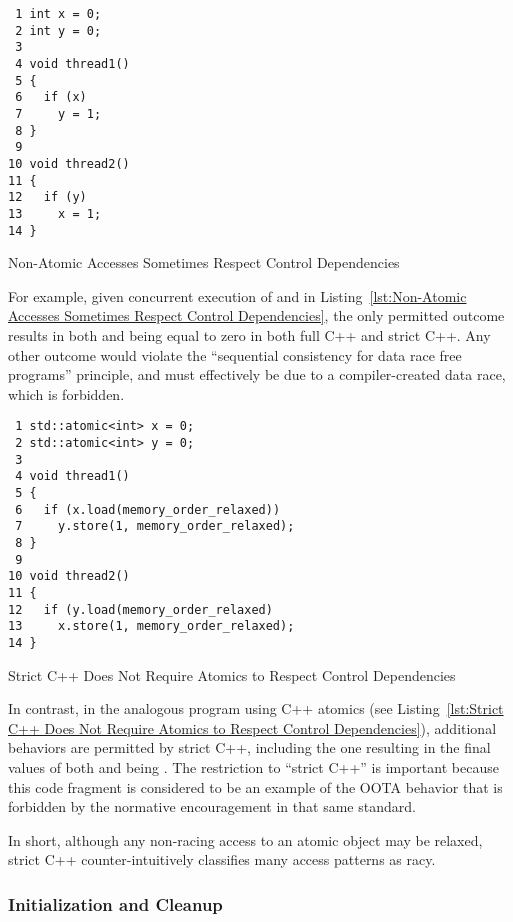 \documentclass[10]{article}
\begin{document}
\begin{listing}[tbp]
\begin{verbatim}
 1 int x = 0;
 2 int y = 0;
 3
 4 void thread1()
 5 {
 6   if (x)
 7     y = 1;
 8 }
 9
10 void thread2()
11 {
12   if (y)
13     x = 1;
14 }
\end{verbatim}
\caption{Non-Atomic Accesses Sometimes Respect Control Dependencies}
\label{lst:Non-Atomic Accesses Sometimes Respect Control Dependencies}
\end{listing}

For example, given concurrent execution of  and
 in
Listing~\ref{lst:Non-Atomic Accesses Sometimes Respect Control Dependencies},
the only permitted outcome results in both  and  being
equal to zero in both full C++ and strict C++.
Any other outcome would violate the ``sequential consistency for
data race free programs'' principle, and must effectively be due to a
compiler-created data race, which is forbidden.

\begin{listing}[tbp]
\begin{verbatim}
 1 std::atomic<int> x = 0;
 2 std::atomic<int> y = 0;
 3
 4 void thread1()
 5 {
 6   if (x.load(memory_order_relaxed))
 7     y.store(1, memory_order_relaxed);
 8 }
 9
10 void thread2()
11 {
12   if (y.load(memory_order_relaxed)
13     x.store(1, memory_order_relaxed);
14 }
\end{verbatim}
\caption{Strict C++ Does Not Require Atomics to Respect Control Dependencies}
\label{lst:Strict C++ Does Not Require Atomics to Respect Control Dependencies}
\end{listing}

In contrast, in the analogous program using C++ atomics
(see Listing~\ref{lst:Strict C++ Does Not Require Atomics to Respect Control Dependencies}),
additional behaviors are permitted by strict C++,
including the one resulting in the final values of both 
and  being .
The restriction to ``strict C++'' is important because this code fragment
is considered to be an example of the OOTA behavior that is forbidden
by the normative encouragement in that same standard.

In short, although any non-racing access to an atomic object may be
relaxed, strict C++ counter-intuitively classifies many access patterns
as racy.

\subsubsection{Initialization and Cleanup}
\label{sec:Initialization and Cleanup}
\end{document}
